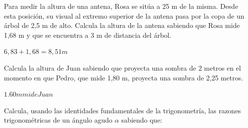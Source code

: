 \documentclass[addpoints,spanish, 12pt,a4paper]{exam}
\begin{document}
\begin{questions}







\question[1] Para medir la altura de una antena, Rosa se sitúa a 25 m de la misma. Desde esta posición, su visual al extremo superior de la antena pasa por la copa de un árbol de 2,5 m de alto. Calcula la altura de la antena sabiendo que Rosa mide 1,68 m y que se encuentra a 3 m de distancia del árbol.
\begin{solution}
    $6,83 + 1,68 = 8,51 m$
\end{solution}


\question[2] Calcula la altura de Juan sabiendo que proyecta una sombra de 2 metros en el momento en
que Pedro, que mide 1,80 m, proyecta una sombra de 2,25 metros.
\begin{solution}
    $1.60 m mide Juan$
\end{solution}


\question[2] Calcula, usando las identidades fundamentales de la trigonometría, las razones trigonométricas de un ángulo agudo $\alpha$ sabiendo que:\begin{parts} 

\end{parts}
\end{questions}
\end{document}
